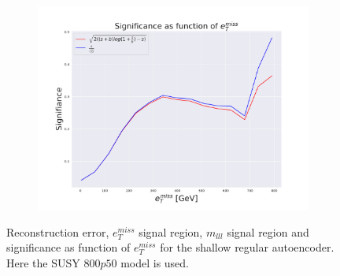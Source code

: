 \begin{figure}[H]
    \hfill  
    \begin{subfigure}{.40\textwidth}
        \includegraphics[width=\textwidth]{Figures/AE_testing/small/2lep/significance_etmiss_800p0p050_-1.2087791708604207.pdf}
        \caption{}
        \label{fig:AE_2lep_small_signi_800_2}
    \end{subfigure}
    \hfill      
    \caption[2lep shallow network | $800p50$ | AE | 2]{Reconstruction error, $e_T^{miss}$ signal region, $m_{lll}$ signal region and significance as function of 
    $e_T^{miss}$ for the shallow regular autoencoder. Here the SUSY $800p50$ model is used.}
    \label{fig:AE_2lep_small_rec_sig_signi_800_2}
\end{figure}







